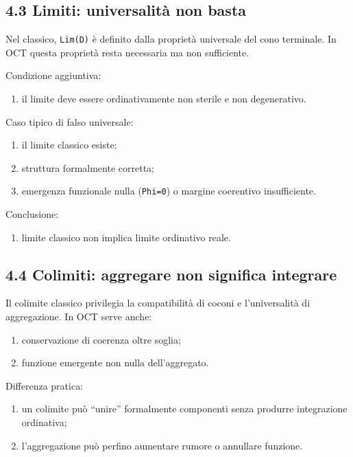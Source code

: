 \subsection{4.3 Limiti: universalità non basta}

Nel classico, \texttt{Lim(D)} è definito dalla proprietà universale del cono terminale. In OCT questa proprietà resta necessaria ma non sufficiente.

Condizione aggiuntiva:

\begin{enumerate}
\def\labelenumi{\arabic{enumi}.}
\tightlist
\item
  il limite deve essere ordinativamente non sterile e non degenerativo.
\end{enumerate}

Caso tipico di falso universale:

\begin{enumerate}
\def\labelenumi{\arabic{enumi}.}
\tightlist
\item
  il limite classico esiste;
\item
  struttura formalmente corretta;
\item
  emergenza funzionale nulla (\texttt{Phi=0}) o margine coerentivo insufficiente.
\end{enumerate}

Conclusione:

\begin{enumerate}
\def\labelenumi{\arabic{enumi}.}
\tightlist
\item
  limite classico non implica limite ordinativo reale.
\end{enumerate}

\subsection{4.4 Colimiti: aggregare non significa integrare}

Il colimite classico privilegia la compatibilità di coconi e l'universalità di aggregazione. In OCT serve anche:

\begin{enumerate}
\def\labelenumi{\arabic{enumi}.}
\tightlist
\item
  conservazione di coerenza oltre soglia;
\item
  funzione emergente non nulla dell'aggregato.
\end{enumerate}

Differenza pratica:

\begin{enumerate}
\def\labelenumi{\arabic{enumi}.}
\tightlist
\item
  un colimite può ``unire'' formalmente componenti senza produrre integrazione ordinativa;
\item
  l'aggregazione può perfino aumentare rumore o annullare funzione.
\end{enumerate}

